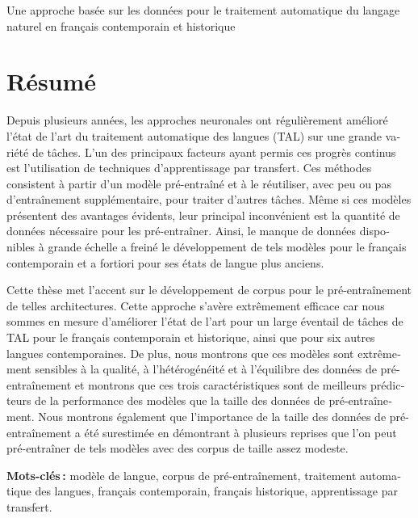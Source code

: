 \begin{otherlanguage}{french}
    \begin{center}
        {\huge Une approche basée sur les données pour le traitement automatique du langage naturel en français contemporain et historique}
    \end{center}

    \section*{Résumé}

    Depuis plusieurs années, les approches neuronales ont régulièrement amélioré l'état de l'art du traitement automatique des langues (TAL) sur une grande variété de tâches. L'un des principaux facteurs ayant permis ces progrès continus est l'utilisation de techniques d'apprentissage par transfert. Ces méthodes consistent à partir d'un modèle pré-entraîné et à le réutiliser, avec peu ou pas d'entraînement supplémentaire, pour traiter d'autres tâches. Même si ces modèles présentent des avantages évidents, leur principal inconvénient est la quantité de données nécessaire pour les pré-entraîner. Ainsi, le manque de données disponibles à grande échelle a freiné le développement de tels modèles pour le français contemporain et a fortiori pour ses états de langue plus anciens.

    Cette thèse met l'accent sur le développement de corpus pour le pré-entraînement de telles architectures. Cette approche s'avère extrêmement efficace car nous sommes en mesure d'améliorer l'état de l'art pour un large éventail de tâches de TAL pour le français contemporain et historique, ainsi que pour six autres langues contemporaines. De plus, nous montrons que ces modèles sont extrêmement sensibles à la qualité, à l'hétérogénéité et à l'équilibre des données de pré-entraînement et montrons que ces trois caractéristiques sont de meilleurs prédicteurs de la performance des modèles que la taille des données de pré-entraînement. Nous montrons également que l'importance de la taille des données de pré-entraînement a été surestimée en démontrant à plusieurs reprises que l'on peut pré-entraîner de tels modèles avec des corpus de taille assez modeste.

    \vspace{1cm}
    \textbf{Mots-clés :} modèle de langue, corpus de pré-entraînement, traitement automatique des langues, français contemporain, français historique, apprentissage par transfert.
\end{otherlanguage}

